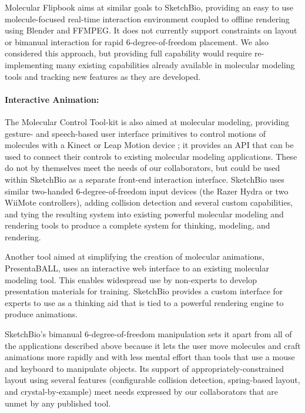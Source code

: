 \documentclass[twocolumn]{bmcart}%
\begin{document}
Molecular Flipbook \cite{flipbook2013} aims at similar goals to SketchBio, providing an easy to use molecule-focused real-time interaction environment coupled to offline rendering using Blender and FFMPEG.  It does not currently support constraints on layout or bimanual interaction for rapid 6-degree-of-freedom placement.
We also considered this approach, but providing full capability would require re-implementing many existing capabilities already available in molecular modeling tools and tracking new features as they are developed.

\paragraph*{Interactive Animation:}
The Molecular Control Tool-kit \cite{sabirmolecular} is also aimed at molecular modeling, providing gesture- and speech-based user interface primitives to control motions of molecules with a Kinect or Leap Motion device \cite{sabirmolecular}; it provides an API that can be used to connect their controls to existing molecular modeling applications.  These do not by themselves meet the needs of our collaborators, but could be used within SketchBio as a separate front-end interaction interface.
SketchBio uses similar two-handed 6-degree-of-freedom input devices (the Razer Hydra or two WiiMote controllers), adding collision detection and several custom capabilities, and tying the resulting system into existing powerful molecular modeling and rendering tools to produce a complete system for thinking, modeling, and rendering.

Another tool aimed at simplifying the creation of molecular animations, PresentaBALL\cite{nickelspresentaball}, uses an interactive web interface to an existing molecular modeling tool.
This enables widespread use by non-experts to develop presentation materials for training.  SketchBio provides a custom interface for experts to use as a thinking aid that is tied to a powerful rendering engine to produce animations.

SketchBio's bimanual 6-degree-of-freedom manipulation sets it apart from all of the applications described above because it lets the user move molecules and craft animations more rapidly and with less mental effort than tools that use a mouse and keyboard to manipulate objects. Its support of appropriately-constrained layout using several features (configurable collision detection, spring-based layout,  and crystal-by-example) meet needs expressed by our collaborators that are unmet by any published tool.
\end{document}

